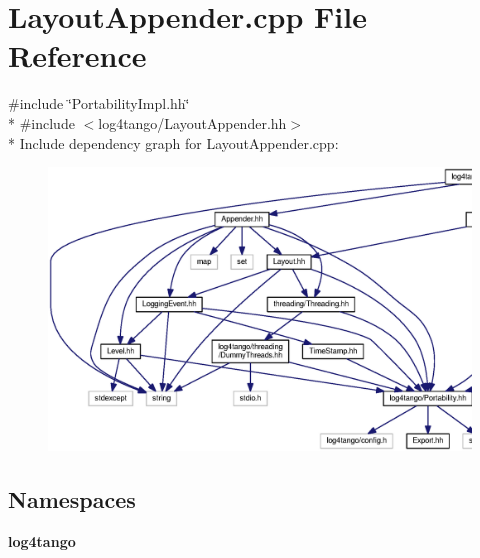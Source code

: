 \section{Layout\-Appender.\-cpp File Reference}
\label{LayoutAppender_8cpp}
{\ttfamily \#include \char`\"{}Portability\-Impl.\-hh\char`\"{}}\\*
{\ttfamily \#include $<$log4tango/\-Layout\-Appender.\-hh$>$}\\*
Include dependency graph for Layout\-Appender.\-cpp\-:
\nopagebreak
\begin{figure}[H]
\begin{center}
\leavevmode
\includegraphics[width=350pt]{d0/d63/LayoutAppender_8cpp__incl}
\end{center}
\end{figure}
\subsection*{Namespaces}
\begin{DoxyCompactItemize}
\item 
{\bf log4tango}
\end{DoxyCompactItemize}
